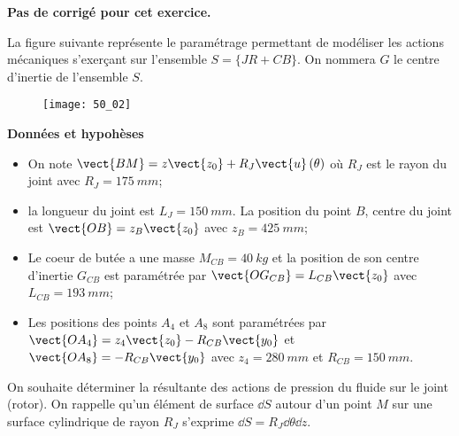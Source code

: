 \normaltrue \difficilefalse \tdifficilefalse
\correctionfalse


\setcounter{question}{0}
\ifcorrection
\else
\textbf{Pas de corrigé pour cet exercice.}
\fi
\ifprof
\else


\ifprof
\else
La figure suivante représente le paramétrage permettant de modéliser les actions mécaniques
s’exerçant sur l’ensemble $S=\{JR+CB\}$. On nommera $G$ le centre d’inertie de l’ensemble
$S$.


\begin{figure}[H]
\centering
\texttt{[image: 50\_02]}
\end{figure}
\fi

\textbf{Données et hypohèses}

\begin{itemize}
\item On note $\vect{BM}=z\vect{z_0}+R_J\vect{u}\left(\theta\right)$ où $R_J$ est le rayon du joint avec $R_J = \SI{175}{mm}$;
\item la longueur du joint est $L_J = \SI{150}{mm}$. La position du point $B$, centre du joint est $\vect{OB}=z_B\vect{z_0}$ avec $z_B = \SI{425}{mm}$;
\item Le coeur de butée a une masse $M_{CB} = \SI{40}{kg}$ et la position de son centre d’inertie $G_{CB}$ est paramétrée par $\vect{OG_{CB}}= L_{CB}\vect{z_0}$ avec $L_{CB} = \SI{193}{mm}$;
\item Les positions des points $A_4$ et $A_8$ sont paramétrées par $\vect{OA_4} = z_4\vect{z_0}-R_{CB}\vect{y_0}$ et
$\vect{OA_8}=-R_{CB}\vect{y_0}$ avec $z_4 = \SI{280}{mm}$ et $R_{CB}=\SI{150}{mm}$.
\end{itemize}


On souhaite déterminer la résultante des actions de pression du fluide sur le joint (rotor).
On rappelle qu’un élément de surface $\dd S$ autour d’un point $M$ sur une surface cylindrique
de rayon $R_J$ s’exprime $\dd S = R_J \dd \theta \dd z$.

